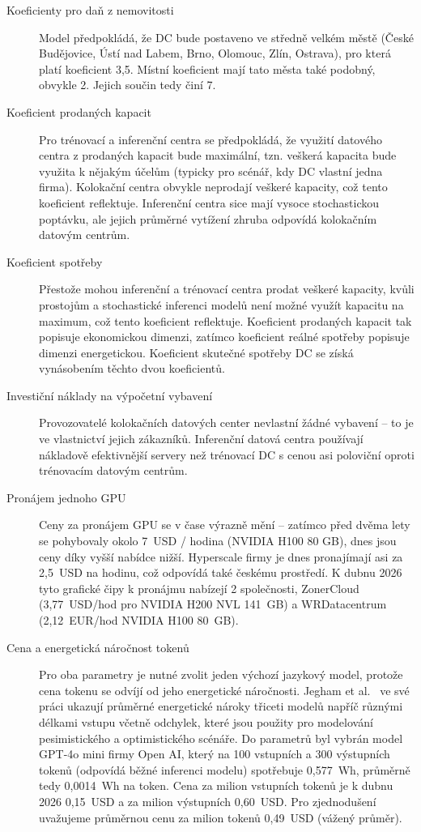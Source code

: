 \begin{description}
    \item[Koeficienty pro daň z nemovitosti] Model předpokládá, že DC bude postaveno ve středně velkém městě (České Budějovice, Ústí nad Labem, Brno, Olomouc, Zlín, Ostrava), pro která platí koeficient 3,5. Místní koeficient mají tato města také podobný, obvykle 2. Jejich součin tedy činí 7. 

    \item[Koeficient prodaných kapacit] Pro trénovací a inferenční centra se předpokládá, že využití datového centra z prodaných kapacit bude maximální, tzn. veškerá kapacita bude využita k nějakým účelům (typicky pro scénář, kdy DC vlastní jedna firma). Kolokační centra obvykle neprodají veškeré kapacity, což tento koeficient reflektuje. Inferenční centra sice mají vysoce stochastickou poptávku, ale jejich průměrné vytížení zhruba odpovídá kolokačním datovým centrům.

    \item[Koeficient spotřeby] Přestože mohou inferenční a trénovací centra prodat veškeré kapacity, kvůli prostojům a stochastické inferenci modelů není možné využít kapacitu na maximum, což tento koeficient reflektuje. Koeficient prodaných kapacit tak popisuje ekonomickou dimenzi, zatímco koeficient reálné spotřeby popisuje dimenzi energetickou. Koeficient skutečné spotřeby DC se získá vynásobením těchto dvou koeficientů.

    \item[Investiční náklady na výpočetní vybavení] Provozovatelé kolokačních datových center nevlastní žádné vybavení -- to je ve vlastnictví jejich zákazníků. Inferenční datová centra používají nákladově efektivnější servery než trénovací DC s cenou asi poloviční oproti trénovacím datovým centrům.~\cite{barroso_data_2026}

    \item[Pronájem jednoho GPU] Ceny za pronájem GPU se v čase výrazně mění -- zatímco před dvěma lety se pohybovaly okolo 7~USD / hodina (NVIDIA H100 80 GB), dnes jsou ceny díky vyšší nabídce nižší. Hyperscale firmy je dnes pronajímají asi za 2,5~USD na hodinu, což odpovídá také českému prostředí. K dubnu 2026 tyto grafické čipy k pronájmu nabízejí 2 společnosti, ZonerCloud (3,77~USD/hod pro NVIDIA H200 NVL 141~GB) a WRDatacentrum (2,12~EUR/hod NVIDIA H100 80~GB).

    \item[Cena a energetická náročnost tokenů] Pro oba parametry je nutné zvolit jeden výchozí jazykový model, protože cena tokenu se odvíjí od jeho energetické náročnosti. Jegham et al.~\cite{jegham_how_2025} ve své práci ukazují průměrné energetické nároky třiceti modelů napříč různými délkami vstupu včetně odchylek, které jsou použity pro modelování pesimistického a optimistického scénáře. Do parametrů byl vybrán model GPT-4o mini firmy Open AI, který na 100 vstupních a 300 výstupních tokenů (odpovídá běžné inferenci modelu) spotřebuje 0,577~Wh, průměrně tedy 0,0014~Wh na token. Cena za milion vstupních tokenů je k dubnu 2026 0,15~USD a za milion výstupních 0,60~USD. Pro zjednodušení uvažujeme průměrnou cenu za milion tokenů 0,49~USD (vážený průměr).

\end{description}

